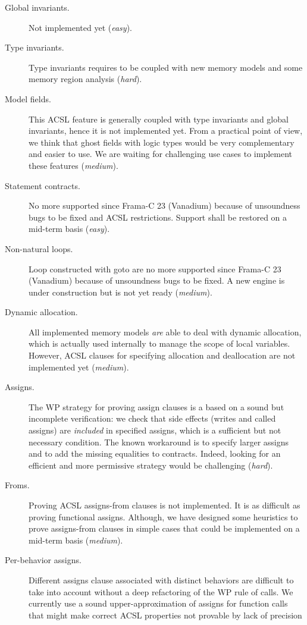 \begin{description}
\item[Global invariants.]
Not implemented yet (\textit{easy}).
\item[Type invariants.]
Type invariants requires to be coupled with new memory models and
some memory region analysis (\textit{hard}).
\item[Model fields.]
This \textsf{ACSL} feature is generally coupled with type invariants and global invariants, hence it is not implemented yet. From a practical point
of view, we think that ghost fields with logic types would be very complementary and easier to use. We are waiting for challenging use cases
to implement these features (\textit{medium}).
\item[Statement contracts.]
No more supported since \textsf{Frama-C 23} (Vanadium) because of
unsoundness bugs to be fixed and \textsf{ACSL} restrictions.
Support shall be restored on a mid-term basis (\textit{easy}).
\item[Non-natural loops.]
Loop constructed with \textsf{goto} are no more supported since
\textsf{Frama-C 23} (Vanadium) because of unsoundness bugs to be fixed.
A new engine is under construction but is not yet ready (\textit{medium}).
\item[Dynamic allocation.]
All implemented memory models \emph{are} able to deal with dynamic allocation,
which is actually used internally to manage the scope of local variables.
However, \textsf{ACSL} clauses for specifying allocation and deallocation
are not implemented yet (\textit{medium}).
\item[Assigns.]
The WP strategy for proving assign clauses is a based on a sound but incomplete verification: we check that side effects
(writes and called assigns) are \emph{included} in specified assigns, which
is a sufficient but not necessary condition. The known workaround is to
specify larger assigns and to add the missing equalities to contracts.
Indeed, looking for an efficient and more permissive strategy would be challenging (\textit{hard}).
\item[Froms.]
Proving \textsf{ACSL} assigns-from clauses is not implemented. It is as difficult as proving functional assigns. Although, we have designed some
heuristics to prove assigns-from clauses in simple cases that could be implemented on a mid-term basis (\textit{medium}).
\item[Per-behavior assigns.]
Different assigns clause associated with distinct behaviors are difficult to
take into account without a deep refactoring of the WP rule of calls. We currently use a sound upper-approximation of assigns for function calls that might make correct \textsf{ACSL} properties not provable by lack of precision

\end{description}
